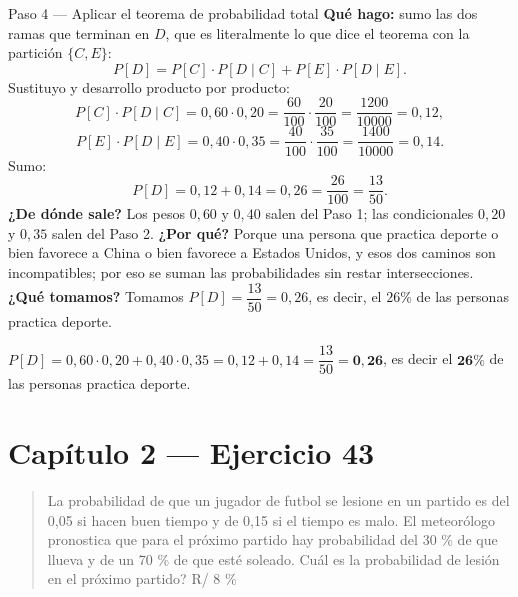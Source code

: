 \documentclass[11pt]{article}
\begin{document}
\begin{sol}
\begin{paso}{Paso 4 --- Aplicar el teorema de probabilidad total}
\textbf{Qu\'e hago:} sumo las dos ramas que terminan en $D$, que es literalmente lo que dice el teorema con la partici\'on $\{C,E\}$:
\[
P[D]=P[C]\cdot P[D\mid C]+P[E]\cdot P[D\mid E].
\]
Sustituyo y desarrollo producto por producto:
\[
P[C]\cdot P[D\mid C]=0{,}60\cdot 0{,}20=\frac{60}{100}\cdot\frac{20}{100}=\frac{1200}{10000}=0{,}12,
\]
\[
P[E]\cdot P[D\mid E]=0{,}40\cdot 0{,}35=\frac{40}{100}\cdot\frac{35}{100}=\frac{1400}{10000}=0{,}14 .
\]
Sumo:
\[
P[D]=0{,}12+0{,}14=0{,}26=\frac{26}{100}=\frac{13}{50}.
\]
\textbf{¿De d\'onde sale?} Los pesos $0{,}60$ y $0{,}40$ salen del Paso 1; las condicionales $0{,}20$ y $0{,}35$ salen del Paso 2.
\textbf{¿Por qu\'e?} Porque una persona que practica deporte o bien favorece a China o bien favorece a Estados Unidos, y esos dos caminos son incompatibles; por eso se suman las probabilidades sin restar intersecciones.
\textbf{¿Qu\'e tomamos?} Tomamos $P[D]=\dfrac{13}{50}=0{,}26$, es decir, el $26\%$ de las personas practica deporte.
\end{paso}

\end{sol}

\begin{resp}
$P[D]=0{,}60\cdot 0{,}20+0{,}40\cdot 0{,}35=0{,}12+0{,}14=\dfrac{13}{50}=\mathbf{0{,}26}$, es decir el $\mathbf{26\%}$ de las personas practica deporte.
\end{resp}

\section*{Cap\'itulo 2 --- Ejercicio 43}

\begin{quote}
La probabilidad de que un jugador de futbol se lesione en un partido es del 0,05 si hacen buen tiempo y de 0,15 si el tiempo es malo. El meteor\'ologo pronostica que para el pr\'oximo partido hay probabilidad del 30 \% de que llueva y de un 70 \% de que est\'e soleado. Cu\'al es la probabilidad de lesi\'on en el pr\'oximo partido? \hfill R/ 8 \%
\end{quote}
\end{document}
